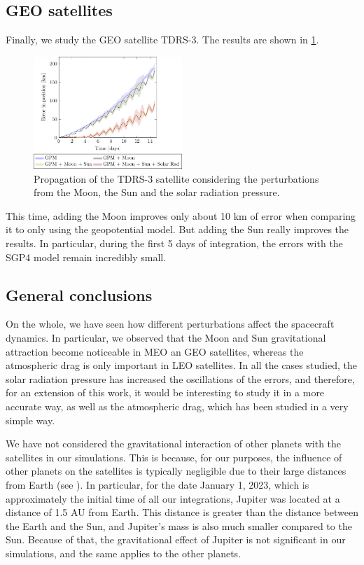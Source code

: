 \documentclass[../main.tex]{subfiles}
\begin{document}
\subsection{GEO satellites}
Finally, we study the GEO satellite TDRS-3. The results are shown in \cref{fig:TDRS}.
\begin{figure}[ht]
  \centering
  \includegraphics[width=0.5\textwidth]{Images/simulation/TDRS-3.pdf}
  \caption{Propagation of the TDRS-3 satellite considering the perturbations from the Moon, the Sun and the solar radiation pressure.}
  \label{fig:TDRS}
\end{figure}

This time, adding the Moon improves only about 10 km of error when comparing it to only using the geopotential model. But adding the Sun really improves the results. In particular, during the first 5 days of integration, the errors with the SGP4 model remain incredibly small.

\subsection{General conclusions}
On the whole, we have seen how different perturbations affect the spacecraft dynamics. In particular, we observed that the Moon and Sun gravitational attraction become noticeable in MEO an GEO satellites, whereas the atmospheric drag is only important in LEO satellites. In all the cases studied, the solar radiation pressure has increased the oscillations of the errors, and therefore, for an extension of this work, it would be interesting to study it in a more accurate way, as well as the atmospheric drag, which has been studied in a very simple way.

We have not considered the gravitational interaction of other planets with the satellites in our simulations. This is because, for our purposes, the influence of other planets on the satellites is typically negligible due to their large distances from Earth (see \cite{montenbruck}). In particular, for the date January 1, 2023, which is approximately the initial time of all our integrations, Jupiter was located at a distance of 1.5 AU from Earth. This distance is greater than the distance between the Earth and the Sun, and Jupiter's mass is also much smaller compared to the Sun. Because of that, the gravitational effect of Jupiter is not significant in our simulations, and the same applies to the other planets.
\end{document}
